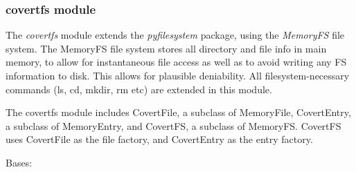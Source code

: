 \documentclass[letterpaper,10pt,english]{sphinxmanual}
\begin{document}
\subsubsection{covertfs module}
\label{File_System:covertfs-module}
The \emph{covertfs} module extends the \emph{pyfilesystem} package, using the \emph{MemoryFS} file system.
The MemoryFS file system stores all directory and file info in main memory, to allow for instantaneous file access as well as to avoid writing any FS information to disk. This allows for plausible deniability. All filesystem-necessary commands (ls, cd, mkdir, rm etc) are extended in this module.

The covertfs module includes CovertFile, a subclass of MemoryFile, CovertEntry, a subclass of MemoryEntry, and CovertFS, a subclass of MemoryFS. CovertFS uses CovertFile as the file factory, and CovertEntry as the entry factory.
\label{File_System:module-File_System.covertfs}

\begin{fulllineitems}
\label{File_System:File_System.covertfs.CovertEntry}
Bases: 

\end{fulllineitems}

\end{document}
